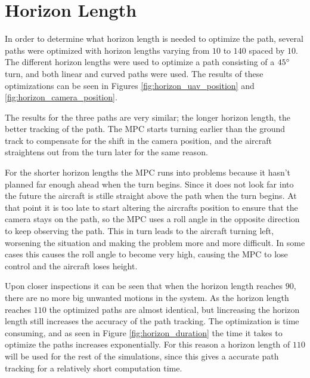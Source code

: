 \section{Horizon Length}

In order to determine what horizon length is needed to optimize the path, several paths were optimized with horizon lengths varying from $10$ to $140$ spaced by $10$. The different horizon lengths were used to optimize a path consisting of a $45\degree$ turn, and both linear and curved paths were used. The results of these optimizations can be seen in Figures \ref{fig:horizon_uav_position} and \ref{fig:horizon_camera_position}.

The results for the three paths are very similar; the longer horizon length, the better tracking of the path. The MPC starts turning earlier than the ground track to compensate for the shift in the camera position, and the aircraft straightens out from the turn later for the same reason.

For the shorter horizon lengths the MPC runs into problems because it hasn't planned far enough ahead when the turn begins. Since it does not look far into the future the aircraft is stille straight above the path when the turn begins. At that point it is too late to start altering the aircrafts position to ensure that the camera stays on the path, so the MPC uses a roll angle in the opposite direction to keep observing the path. This in turn leads to the aircraft turning left, worsening the situation and making the problem more and more difficult. In some cases this causes the roll angle to become very high, causing the MPC to lose control and the aircraft loses height.

Upon closer inspections it can be seen that when the horizon length reaches $90$, there are no more big unwanted motions in the system. As the horizon length reaches $110$ the optimized paths are almost identical, but lincreasing the horizon length still increases the accuracy of the path tracking. The optimization is time consuming, and as seen in Figure \ref{fig:horizon_duration} the time it takes to optimize the paths increases exponentially. For this reason a horizon length of $110$ will be used for the rest of the simulations, since this gives a accurate path tracking for a relatively short computation time.


